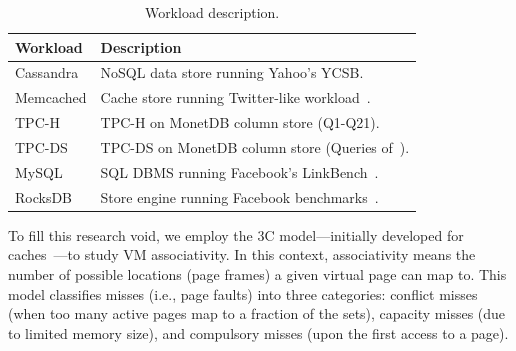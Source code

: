 \begin{table}
 \begin{center}
  \caption{Workload description.}
  \scalebox{0.7}
  \small
  \vspace{0.01in}
  \label{table:workload}
  \renewcommand{\arraystretch}{1.0}
   {\scriptsize
    \begin{tabular}{ l  l }
     \toprule
      {\bf Workload}                  & {\bf Description}  \\
     	\toprule
      	\multirow{1}{*}{Cassandra}                       &  NoSQL data store running Yahoo's YCSB. \\
     	\cmidrule{2-2}
      	\multirow{1}{*}{Memcached}                      & Cache store running Twitter-like workload~\cite{lim:thin}. \\
	\cmidrule{2-2}
		\multirow{1}{*}{TPC-H}	& TPC-H on MonetDB column store (Q1-Q21). \\
	\cmidrule{2-2}
		\multirow{1}{*}{TPC-DS}	& TPC-DS on MonetDB column store (Queries of~\cite{kocberber:meet}). \\
		\cmidrule{2-2}
	 	\multirow{1}{*}{MySQL} 			& SQL DBMS running Facebook's LinkBench~\cite{facebook:linkbench}. \\
     \cmidrule{2-2}
      \multirow{1}{*}{RocksDB}                             &  Store engine running Facebook benchmarks~\cite{facebook:rocksdb}. \\ %

     \bottomrule
    \end{tabular}
   } %
 \end{center}
  \vspace{-0.1in}
\end{table}

To fill this research void, we employ the 3C model---initially developed for caches~\cite{hill:aspects}---to study VM associativity. In this context, associativity means the number of possible locations (page frames) a given virtual page can map to. This model classifies misses (i.e., page faults) into three categories: conflict misses (when too many active pages map to a fraction of the sets), capacity misses (due to limited memory size), and compulsory misses (upon the first access to a page). 

